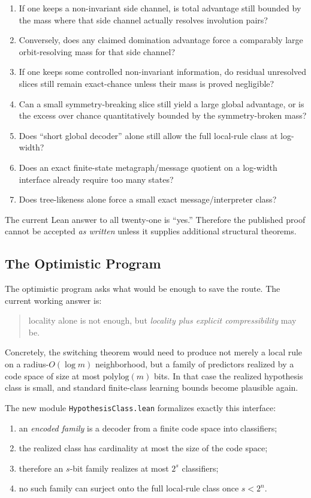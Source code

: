 \documentclass[11pt]{article}
\theoremstyle{remark}
\begin{document}
\begin{enumerate}[leftmargin=1.5em]
  antisymmetric part of that weighting?
  \item If one keeps a non-invariant side channel, is total advantage still bounded by the mass
  where that side channel actually resolves involution pairs?
  \item Conversely, does any claimed domination advantage force a comparably large orbit-resolving
  mass for that side channel?
  \item If one keeps some controlled non-invariant information, do residual unresolved slices still
  remain exact-chance unless their mass is proved negligible?
  \item Can a small symmetry-breaking slice still yield a large global advantage, or is the excess
  over chance quantitatively bounded by the symmetry-broken mass?
  \item Does ``short global decoder'' alone still allow the full local-rule class at log-width?
  \item Does an exact finite-state metagraph/message quotient on a log-width interface already
  require too many states?
  \item Does tree-likeness alone force a small exact message/interpreter class?
\end{enumerate}

The current Lean answer to all twenty-one is ``yes.''  Therefore the published proof cannot be
accepted \emph{as written} unless it supplies additional structural theorems.

\subsection{The Optimistic Program}

The optimistic program asks what would be enough to save the route.
The current working answer is:
\begin{quote}
locality alone is not enough, but \emph{locality plus explicit compressibility} may be.
\end{quote}

Concretely, the switching theorem would need to produce not merely a local rule on a
radius-$O(\log m)$ neighborhood, but a family of predictors realized by a code space of
size at most \(\mathrm{polylog}(m)\) bits.  In that case the realized hypothesis class is
small, and standard finite-class learning bounds become plausible again.

The new module \texttt{HypothesisClass.lean} formalizes exactly this interface:
\begin{enumerate}[leftmargin=1.5em]
  \item an \emph{encoded family} is a decoder from a finite code space into classifiers;
  \item the realized class has cardinality at most the size of the code space;
  \item therefore an $s$-bit family realizes at most $2^s$ classifiers;
  \item no such family can surject onto the full local-rule class once $s < 2^n$.
\end{enumerate}
\end{document}
